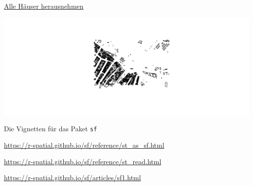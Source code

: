 \documentclass[ignorenonframetext,]{beamer}
\newenvironment{Shaded}{\begin{snugshade}}{\end{snugshade}}
\newcommand{\KeywordTok}[1]{\textcolor[rgb]{0.13,0.29,0.53}{\textbf{#1}}}
\newcommand{\StringTok}[1]{\textcolor[rgb]{0.31,0.60,0.02}{#1}}
\newcommand{\OperatorTok}[1]{\textcolor[rgb]{0.81,0.36,0.00}{\textbf{#1}}}
\newcommand{\NormalTok}[1]{#1}
\begin{document}
\begin{frame}[fragile]{\href{https://cran.r-project.org/web/packages/sf/vignettes/sf4.html}{Alle
Häuser herausnehmen}}

\begin{Shaded}
\end{Shaded}

\includegraphics{slides_all2gether_part2_files/figure-beamer/unnamed-chunk-203-1.pdf}

\end{frame}

\begin{frame}{Die Vignetten für das Paket \texttt{sf}}

\url{https://r-spatial.github.io/sf/reference/st_as_sf.html}

\url{https://r-spatial.github.io/sf/reference/st_read.html}

\url{https://r-spatial.github.io/sf/articles/sf1.html}

\end{frame}
\end{document}
